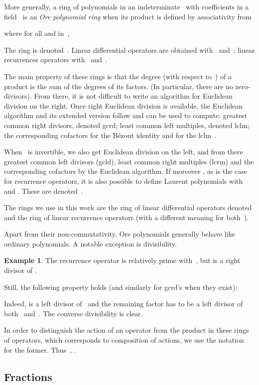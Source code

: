 \documentclass{amsart}
\theoremstyle{definition}
\newtheorem{example}{Example}
\begin{document}
More generally, a ring of polynomials in an indeterminate~ with coefficients in a field~ is an \emph{Ore polynomial ring} when its product is defined by associativity from

where for all  and  in~, 

The ring is denoted~. Linear differential operators are obtained with~ and~; linear recurrences operators with~ and~. 

The main property of these rings is that the degree (with respect to~) of a product is the sum of the degrees of its factors. (In particular, there are no zero-divisors). From there, it is not difficult to write an algorithm for Euclidean division on the right. Once right Euclidean division is available, the Euclidean algorithm and its extended version follow and can be used to compute: greatest common right divisors, denoted gcrd; least common left  multiples, denoted lclm; the corresponding cofactors for the Bézout identity and for the lclm~\cite{Ore33,BronsteinPetkovsek1996}.

When~ is invertible, we also get Euclidean division on the left, and from there greatest common left divisors (gcld), least common right multiples (lcrm) and the corresponding cofactors by the Euclidean algorithm.
If moreover , as is the case for recurrence operators, it is also possible to define Laurent polynomials with~ and . These are denoted~. 

The rings we use in this work are the ring of linear differential operators denoted  and the ring of linear recurrence operators  (with a different meaning for both~).


Apart from their non-commutativity, Ore polynomials generally behave like ordinary polynomials. A notable exception is divisibility. 
\begin{example}The recurrence operator  is relatively prime with~, but  is a right divisor of .
\end{example}
Still, the following property holds (and similarly for gcrd's when they exist):

Indeed,  is a left divisor of~ and the remaining factor has to be a left divisor of both~ and~. The converse divisibility is clear.

In order to distinguish the action of an operator from the product in these rings of operators, which corresponds to composition of actions, we use the notation~ for the former. Thus~, .

\subsection{Fractions}
\end{document}
